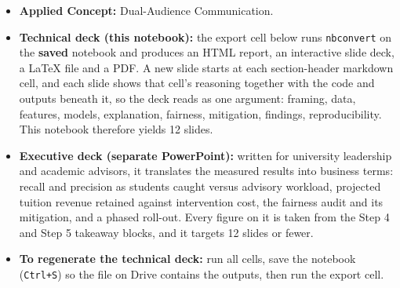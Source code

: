 \documentclass[11pt]{article}
\providecommand{\tightlist}{%
      \setlength{\itemsep}{0pt}\setlength{\parskip}{0pt}}
\begin{document}
\begin{itemize}
\tightlist
\item
  \textbf{Applied Concept:} Dual-Audience Communication.
\item
  \textbf{Technical deck (this notebook):} the export cell below runs
  \texttt{nbconvert} on the \textbf{saved} notebook and produces an HTML
  report, an interactive slide deck, a LaTeX file and a PDF. A new slide
  starts at each section-header markdown cell, and each slide shows that
  cell's reasoning together with the code and outputs beneath it, so the
  deck reads as one argument: framing, data, features, models,
  explanation, fairness, mitigation, findings, reproducibility. This
  notebook therefore yields 12 slides.
\item
  \textbf{Executive deck (separate PowerPoint):} written for university
  leadership and academic advisors, it translates the measured results
  into business terms: recall and precision as students caught versus
  advisory workload, projected tuition revenue retained against
  intervention cost, the fairness audit and its mitigation, and a phased
  roll-out. Every figure on it is taken from the Step 4 and Step 5
  takeaway blocks, and it targets 12 slides or fewer.
\item
  \textbf{To regenerate the technical deck:} run all cells, save the
  notebook (\texttt{Ctrl+S}) so the file on Drive contains the outputs,
  then run the export cell.
\end{itemize}
\end{document}
